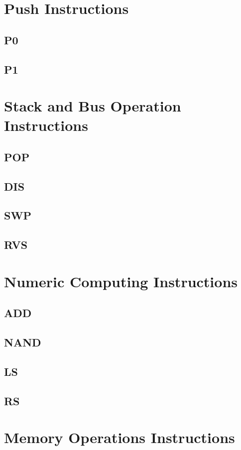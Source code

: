 \documentclass[11pt]{book}
\begin{document}
    \section{Push Instructions}
    \subsection{P0}
    \subsection{P1}

    \section{Stack and Bus Operation Instructions}
    \subsection{POP}
    \subsection{DIS}
    \subsection{SWP}
    \subsection{RVS}

    \section{Numeric Computing Instructions}
    \subsection{ADD}
    \subsection{NAND}
    \subsection{LS}
    \subsection{RS}

    \section{Memory Operations Instructions}
\end{document}
